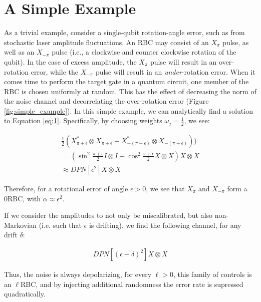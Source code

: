 \documentclass[aps,nofootinbib,pra,notitlepage,twocolumn]{revtex4-1}
\begin{document}
\section{A Simple Example}
As a trivial example, consider a single-qubit rotation-angle error, such as from stochastic laser amplitude fluctuations. An RBC may consist of an $X_\pi$ pulse, as well as an $X_{-\pi}$ pulse (i.e., a clockwise and counter clockwise rotation of the qubit). In the case of excess amplitude, the $X_\pi$ pulse will result in an over-rotation error, while the $X_{-\pi}$ pulse will result in an \emph{under}-rotation error. When it comes time to perform the target gate in a quantum circuit, one member of the RBC is chosen uniformly at random. This has the effect of decreasing the norm of the noise channel and decorrelating the over-rotation error (Figure \ref{fig:simple_example}). In this simple example, we can analytically find a solution to Equation \ref{eq:1}. Specifically, by choosing weights $\omega_j=\frac{1}{2}$, we see:

\begin{equation}
  \begin{gathered}
    \frac{1}{2}(X^*_{\pi + \epsilon}\otimes X_{\pi + \epsilon} + X^*_{-(\pi + \epsilon)}\otimes X_{-(\pi + \epsilon)})) \\
    = (\sin^2{\frac{\pi + \epsilon}{2}}I\otimes I + \cos^2{\frac{\pi + \epsilon}{2}}X\otimes X)X\otimes X \\
    \approx DPN[\epsilon^2]X\otimes X
  \end{gathered}
\end{equation}

Therefore, for a rotational error of angle $\epsilon > 0$, we see that $X_\pi$ and  $X_{-\pi}$  form a 0RBC, with $\alpha\approx\epsilon^2$.

If we consider the amplitudes to not only be miscalibrated, but also non-Markovian (i.e. such that $\epsilon$ is drifting), we find the following channel, for any drift $\delta$:

\begin{equation}
  \begin{gathered}
  DPN[(\epsilon + \delta)^2]X\otimes X
  \end{gathered}
\end{equation}

Thus, the noise is always depolarizing, for every $\ell > 0$, this family of controls is an $\ell$RBC, and by injecting additional randomness the error rate is supressed quadratically.
\end{document}
